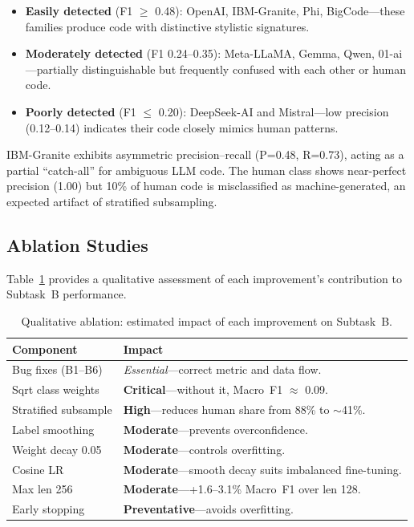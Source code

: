 \documentclass[11pt]{article}
\begin{document}
\begin{itemize}
    \item \textbf{Easily detected} (F1 $\geq$ 0.48): OpenAI, IBM-Granite, Phi, BigCode---these families produce code with distinctive stylistic signatures.
    \item \textbf{Moderately detected} (F1 0.24--0.35): Meta-LLaMA, Gemma, Qwen, 01-ai---partially distinguishable but frequently confused with each other or human code.
    \item \textbf{Poorly detected} (F1 $\leq$ 0.20): DeepSeek-AI and Mistral---low precision (0.12--0.14) indicates their code closely mimics human patterns.
\end{itemize}

IBM-Granite exhibits asymmetric precision--recall (P=0.48, R=0.73), acting as a partial ``catch-all'' for ambiguous LLM code. The human class shows near-perfect precision (1.00) but 10\% of human code is misclassified as machine-generated, an expected artifact of stratified subsampling.

\subsection{Ablation Studies}

Table~\ref{tab:ablation} provides a qualitative assessment of each improvement's contribution to Subtask~B performance.

\begin{table}[ht]
\centering
\footnotesize
\begin{tabularx}{\columnwidth}{@{}l X@{}}
\toprule
\textbf{Component} & \textbf{Impact} \\ \midrule
Bug fixes (B1--B6) & \textit{Essential}---correct metric and data flow. \\
Sqrt class weights & \textbf{Critical}---without it, Macro~F1 $\approx$ 0.09. \\
Stratified subsample & \textbf{High}---reduces human share from 88\% to $\sim$41\%. \\
Label smoothing & \textbf{Moderate}---prevents overconfidence. \\
Weight decay 0.05 & \textbf{Moderate}---controls overfitting. \\
Cosine LR & \textbf{Moderate}---smooth decay suits imbalanced fine-tuning. \\
Max len 256 & \textbf{Moderate}---+1.6--3.1\% Macro~F1 over len 128. \\
Early stopping & \textbf{Preventative}---avoids overfitting. \\
\bottomrule
\end{tabularx}
\caption{Qualitative ablation: estimated impact of each improvement on Subtask~B.}
\label{tab:ablation}
\end{table}
\end{document}
